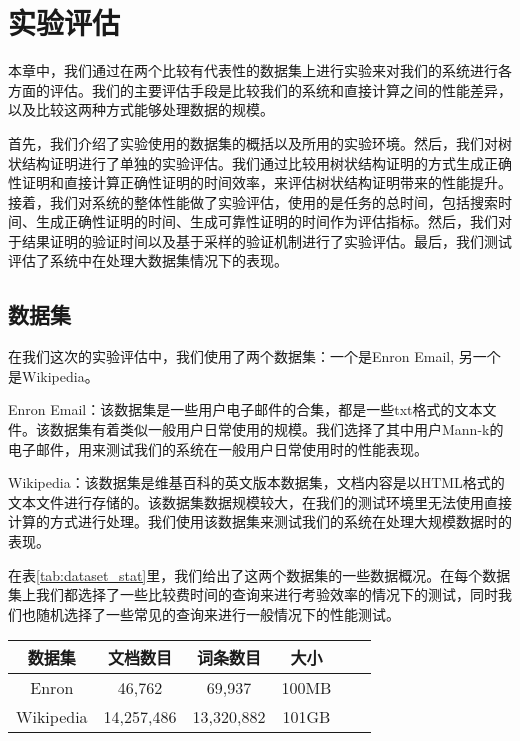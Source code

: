 \chapter{实验评估}
\label{chap:evaluation}
本章中，我们通过在两个比较有代表性的数据集上进行实验来对我们的系统进行各方面的评估。我们的主要评估手段是比较我们的系统和直接计算之间的性能差异，以及比较这两种方式能够处理数据的规模。

首先，我们介绍了实验使用的数据集的概括以及所用的实验环境。然后，我们对树状结构证明进行了单独的实验评估。我们通过比较用树状结构证明的方式生成正确性证明和直接计算正确性证明的时间效率，来评估树状结构证明带来的性能提升。接着，我们对系统的整体性能做了实验评估，使用的是任务的总时间，包括搜索时间、生成正确性证明的时间、生成可靠性证明的时间作为评估指标。然后，我们对于结果证明的验证时间以及基于采样的验证机制进行了实验评估。最后，我们测试评估了系统中在处理大数据集情况下的表现。

\section{数据集}

在我们这次的实验评估中，我们使用了两个数据集：一个是Enron Email, 另一个是Wikipedia。

Enron Email：该数据集是一些用户电子邮件的合集，都是一些txt格式的文本文件。该数据集有着类似一般用户日常使用的规模。我们选择了其中用户Mann-k的电子邮件，用来测试我们的系统在一般用户日常使用时的性能表现。

Wikipedia：该数据集是维基百科的英文版本数据集，文档内容是以HTML格式的文本文件进行存储的。该数据集数据规模较大，在我们的测试环境里无法使用直接计算的方式进行处理。我们使用该数据集来测试我们的系统在处理大规模数据时的表现。

在表\ref{tab:dataset_stat}里，我们给出了这两个数据集的一些数据概况。在每个数据集上我们都选择了一些比较费时间的查询来进行考验效率的情况下的测试，同时我们也随机选择了一些常见的查询来进行一般情况下的性能测试。
\begin{table}[htb]
    \centering
    \begin{tabular}{cccccc}
        \toprule
        数据集 & 文档数目 & 词条数目 & 大小 \\
        \midrule
        Enron & 46,762 & 69,937 & 100MB  \\
        Wikipedia & 14,257,486 & 13,320,882 & 101GB  \\
        \bottomrule
    \end{tabular}
\end{table}


